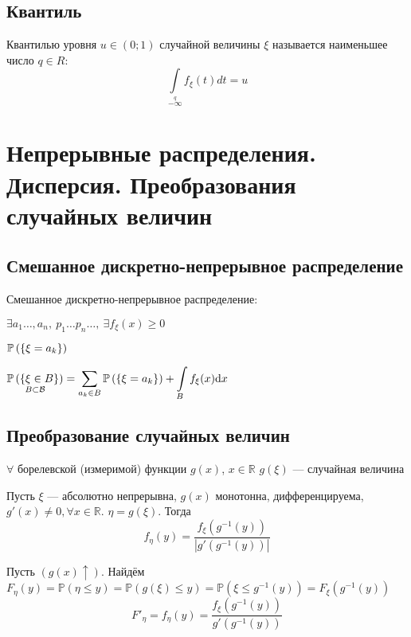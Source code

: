 \documentclass[a4paper, 10pt]{article}
\begin{document}
\subsection{Квантиль}
 Квантилью уровня $u\in(0;1)$ случайной величины $\xi$ называется наименьшее число $q\in\mathbb{}R$:
\begin{equation*}
    \int\limits_{-\infty}\limits^q f_{\xi}(t)dt=u
\end{equation*}










\newpage
\section{Непрерывные распределения. Дисперсия. Преобразования случайных величин}
\subsection{Смешанное дискретно-непрерывное распределение}
 Смешанное дискретно-непрерывное распределение:
\begin{center}
    $\exists a_1\dots,a_n,\ p_1\dots p_n\dots,\ \exists f_\xi(x)\geqslant 0$

    $\mathbb{P}\left(\{\xi=a_k\}\right)$

    $\underset{B\subset\bk}{\prob{\xi\in B}}=\sum_{a_k\in B}\prob{\xi=a_k}+\int\limits_B f_\xi(x)\d{x}$
\end{center}

\subsection{Преобразование случайных величин}
\comment $\forall$ борелевской (измеримой) функции $g(x)$, $x\in\mathbb{R}$ $g(\xi)$ — случайная величина

\theorem Пусть $\xi$ — абсолютно непрерывна, $g(x)$ монотонна, дифференцируема, $g'(x)\ne 0,\forall x\in\mathbb{R}$. $\eta=g(\xi)$. Тогда 
\begin{equation*}
    f_\eta(y)=\frac{f_\xi(g^{-1}(y))}{|g'(g^{-1}(y))|}
\end{equation*}

\proof Пусть $(g(x)\uparrow)$. Найдём $F_\eta(y)=\mathbb{P}(\eta\leq y)=\mathbb{P}(g(\xi)\leq y)=\mathbb{P}(\xi\leq g^{-1}(y))=F_\xi(g^{-1}(y))$
\begin{equation*}
    F'_\eta=f_\eta(y)=\frac{f_\xi(g^{-1}(y))}{g'(g^{-1}(y))}
\end{equation*}
\end{document}
